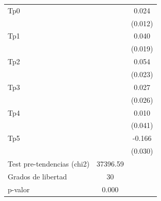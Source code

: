 {\begin{tabular}{l*{2}{c}}
\addlinespace
Tp0         &                     &       0.024\sym{**} \\
            &                     &     (0.012)         \\
\addlinespace
Tp1         &                     &       0.040\sym{**} \\
            &                     &     (0.019)         \\
\addlinespace
Tp2         &                     &       0.054\sym{**} \\
            &                     &     (0.023)         \\
\addlinespace
Tp3         &                     &       0.027         \\
            &                     &     (0.026)         \\
\addlinespace
Tp4         &                     &       0.010         \\
            &                     &     (0.041)         \\
\addlinespace
Tp5         &                     &      -0.166\sym{***}\\
            &                     &     (0.030)         \\
\midrule
Test pre-tendencias (chi2)&    37396.59         &                     \\
Grados de libertad&          30         &                     \\
p-valor     &       0.000         &                     \\
\bottomrule
\end{tabular}
}
